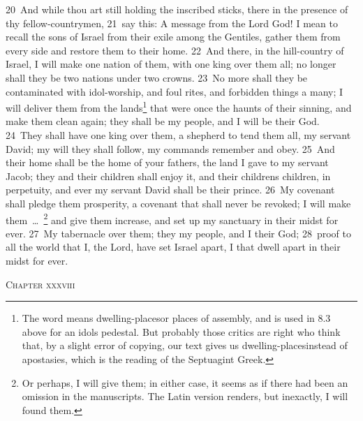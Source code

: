 \documentclass[10pt]{book} %
\begin{document}
\textcolor{benred8}{20}~And while thou art still holding the inscribed sticks, there in the presence of thy fellow-countrymen, \textcolor{benred8}{21}~say this: A message from the Lord God! I mean to recall the sons of Israel from their exile among the Gentiles, gather them from every side and restore them to their home. \textcolor{benred8}{22}~And there, in the hill-country of Israel, I will make one nation of them, with one king over them all; no longer shall they be two nations under two crowns. \textcolor{benred8}{23}~No more shall they be contaminated with idol-worship, and foul rites, and forbidden things a many; I will deliver them from the lands\footnote[3]{The word means \textasciigrave dwelling-places\textquotesingle  or \textasciigrave places of assembly\textquotesingle , and is used in 8.3 above for an idol\textquotesingle s pedestal. But probably those critics are right who think that, by a slight error of copying, our text gives us \textasciigrave dwelling-places\textquotesingle  instead of \textasciigrave apostasies\textquotesingle , which is the reading of the Septuagint Greek.} that were once the haunts of their sinning, and make them clean again; they shall be my people, and I will be their God. \textcolor{benred8}{24}~They shall have one king over them, a shepherd to tend them all, my servant David; my will they shall follow, my commands remember and obey. \textcolor{benred8}{25}~And their home shall be the home of your fathers, the land I gave to my servant Jacob; they and their children shall enjoy it, and their children\textquotesingle s children, in perpetuity, and ever my servant David shall be their prince. \textcolor{benred8}{26}~My covenant shall pledge them prosperity, a covenant that shall never be revoked; I will make them~\ldots\ \footnote[4]{Or perhaps, \textasciigrave I will give them\textquotesingle ; in either case, it seems as if there had been an omission in the manuscripts. The Latin version renders, but inexactly, \textasciigrave I will found them\textquotesingle .} and give them increase, and set up my sanctuary in their midst for ever. \textcolor{benred8}{27}~My tabernacle over them; they my people, and I their God; \textcolor{benred8}{28}~proof to all the world that I, the Lord, have set Israel apart, I that dwell apart in their midst for ever.
\begin{large}\begin{center}\textsc{Chapter xxxviii}\end{center}\end{large}
\end{document}
